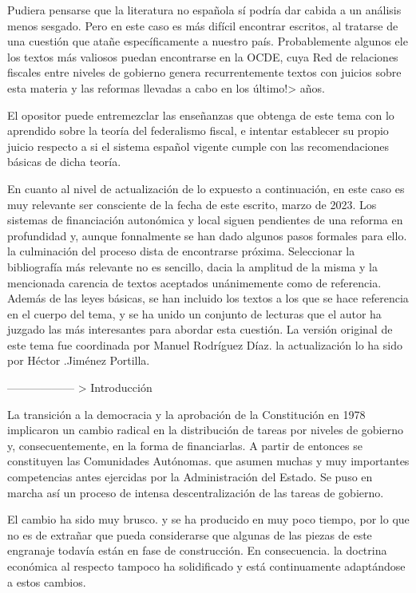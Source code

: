\documentclass[10pt,a4paper]{article}
\begin{document}
Pudiera pensarse que la literatura no española sí podría dar cabida a un análisis menos sesgado. Pero en este caso es más difícil encontrar escritos, al tratarse de una cuestión que atañe específicamente a nuestro país. Probablemente algunos ele los textos más valiosos puedan encontrarse en la OCDE, cuya Red de relaciones fiscales entre niveles de gobierno genera recurrentemente textos con juicios sobre esta materia y las reformas llevadas a cabo en los último!> años.

El opositor puede entremezclar las enseñanzas que obtenga de este tema con lo aprendido sobre la teoría del federalismo fiscal, e intentar establecer su propio juicio respecto a si el sistema español vigente cumple con las recomendaciones básicas de dicha teoría. 

En cuanto al nivel de actualización de lo expuesto a continuación, en este caso es muy relevante  ser consciente de la fecha de este escrito, marzo de 2023. Los sistemas de financiación autonómica y local siguen pendientes de una reforma en profundidad y, aunque fonnalmente se han dado algunos pasos formales para ello. la culminación del proceso dista de encontrarse próxima. Seleccionar la bibliografía más relevante no es sencillo, dacia la amplitud de la misma y la mencionada carencia de textos aceptados unánimemente como de referencia. Además de las leyes básicas, se han incluido los textos a los que se hace referencia en el cuerpo del tema, y se ha unido un conjunto de lecturas que el autor ha juzgado las más interesantes para abordar esta cuestión. La versión original de este tema fue coordinada por Manuel Rodríguez Díaz. la actualización lo ha sido por Héctor .Jiménez Portilla.


------------------ > Introducción

La transición a la democracia y la aprobación de la Constitución en 1978 implicaron un cambio radical en la distribución de tareas por niveles de gobierno y, consecuentemente, en la forma de financiarlas. A partir de entonces se constituyen las Comunidades Autónomas. que asumen muchas y muy importantes competencias antes ejercidas por la Administración del Estado. Se puso en marcha así un proceso de intensa descentralización de las tareas de gobierno.

El cambio ha sido muy brusco. y se ha producido en muy poco tiempo, por lo que no es de extrañar que pueda considerarse que algunas de las piezas de este engranaje todavía están en fase de construcción. En consecuencia. la doctrina económica al respecto tampoco ha solidificado y está continuamente adaptándose a estos cambios.
\end{document}
